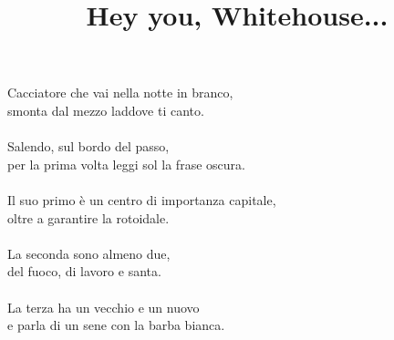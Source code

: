 \documentclass[12pt]{article}
\title{Hey you, Whitehouse...}
\date{}
\begin{document}
\maketitle
\thispagestyle{empty}
\begin{center}
Cacciatore che vai nella notte in branco,\\
smonta dal mezzo laddove ti canto.\\
\ \\
Salendo, sul bordo del passo,\\
per la prima volta leggi sol la frase oscura.\\
\ \\
Il suo primo è un centro di importanza capitale,\\
oltre a garantire la rotoidale.\\
\ \\
La seconda sono almeno due, \\
del fuoco, di lavoro e santa.\\
\ \\
La terza ha un vecchio e un nuovo\\ 
e parla di un sene con la barba bianca.\\
\end{center}
\end{document}
